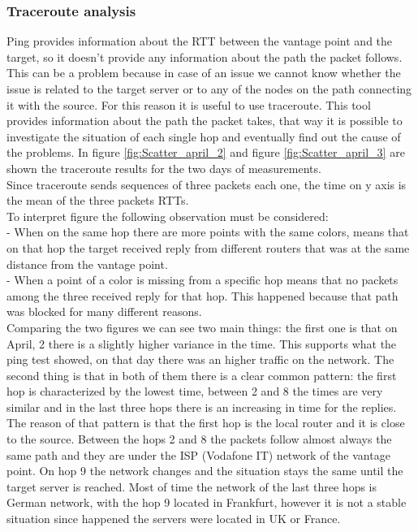 \documentclass[a4paper,10pt]{article}
\begin{document}
\begin{multicols}{2}
\subsubsection*{Traceroute analysis}
Ping provides information about the RTT between the vantage point and the target, so it doesn't provide any information about the path the packet follows.
This can be a problem because in case of an issue we cannot know whether the issue is related to the target server or to any of the nodes on the path
connecting it with the source. For this reason it is useful to use traceroute. This tool provides information about the path the packet takes, that way 
it is possible to investigate the situation of each single hop and eventually find out the cause of the problems. In figure \ref{fig:Scatter_april_2} and
figure \ref{fig:Scatter_april_3} are shown the traceroute results for the two days of measurements.\\
Since traceroute sends sequences of three packets each one, the time on y axis is the mean of the three packets RTTs. \\
To interpret figure the following observation must be considered:\\
- When on the same hop there are more points with the same colors, means that on that hop 
the target received reply from different routers that was at the same distance from the vantage point. \\
- When a point of a color is missing from a specific hop means that no packets among the three received reply for that hop. This happened because that path 
was blocked for many different reasons.\\
Comparing the two figures we can see two main things: the first one is that on April, 2 there is a slightly higher variance in the time. This supports
what the ping test showed, on that day there was an higher traffic on the network. The second thing is that in both of them there
is a clear common pattern: the first hop is characterized by the lowest time, between 2 and 8 the times are very similar and in the last three hops there
is an increasing in time for the replies. The reason of that pattern is that the first hop is the local router and it is close to the source. Between
the hops 2 and 8 the packets follow almost always the same path and they are under the ISP (Vodafone IT) network of the vantage point. On hop 9 the network 
changes and the situation stays the same until the target server is reached. Most of time the network of the last three hops is German network, with the 
hop 9 located in Frankfurt, however it is not a stable situation since happened the servers were located in UK or France.    


\end{multicols}
\end{document}
